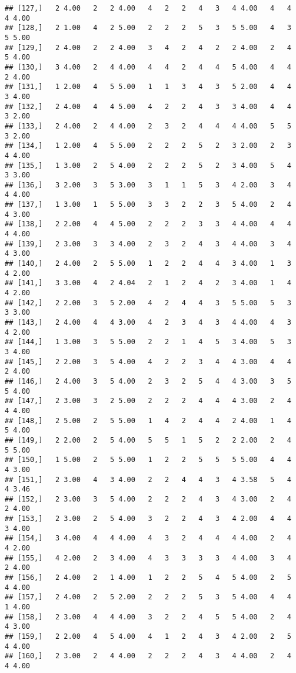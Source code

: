 \documentclass[]{article}
\begin{document}
\begin{verbatim}
## [127,]   2 4.00   2   2 4.00   4   2   2   4   3   4 4.00   4   4   4 4.00
## [128,]   2 1.00   4   2 5.00   2   2   2   5   3   5 5.00   4   3   5 5.00
## [129,]   2 4.00   2   2 4.00   3   4   2   4   2   2 4.00   2   4   5 4.00
## [130,]   3 4.00   2   4 4.00   4   4   2   4   4   5 4.00   4   4   2 4.00
## [131,]   1 2.00   4   5 5.00   1   1   3   4   3   5 2.00   4   4   3 4.00
## [132,]   2 4.00   4   4 5.00   4   2   2   4   3   3 4.00   4   4   3 2.00
## [133,]   2 4.00   2   4 4.00   2   3   2   4   4   4 4.00   5   5   3 2.00
## [134,]   1 2.00   4   5 5.00   2   2   2   5   2   3 2.00   2   3   4 4.00
## [135,]   1 3.00   2   5 4.00   2   2   2   5   2   3 4.00   5   4   3 3.00
## [136,]   3 2.00   3   5 3.00   3   1   1   5   3   4 2.00   3   4   4 4.00
## [137,]   1 3.00   1   5 5.00   3   3   2   2   3   5 4.00   2   4   4 3.00
## [138,]   2 2.00   4   4 5.00   2   2   2   3   3   4 4.00   4   4   4 4.00
## [139,]   2 3.00   3   3 4.00   2   3   2   4   3   4 4.00   3   4   4 3.00
## [140,]   2 4.00   2   5 5.00   1   2   2   4   4   3 4.00   1   3   4 2.00
## [141,]   3 3.00   4   2 4.04   2   1   2   4   2   3 4.00   1   4   4 2.00
## [142,]   2 2.00   3   5 2.00   4   2   4   4   3   5 5.00   5   3   3 3.00
## [143,]   2 4.00   4   4 3.00   4   2   3   4   3   4 4.00   4   3   4 2.00
## [144,]   1 3.00   3   5 5.00   2   2   1   4   5   3 4.00   5   3   3 4.00
## [145,]   2 2.00   3   5 4.00   4   2   2   3   4   4 3.00   4   4   2 4.00
## [146,]   2 4.00   3   5 4.00   2   3   2   5   4   4 3.00   3   5   5 4.00
## [147,]   2 3.00   3   2 5.00   2   2   2   4   4   4 3.00   2   4   4 4.00
## [148,]   2 5.00   2   5 5.00   1   4   2   4   4   2 4.00   1   4   5 4.00
## [149,]   2 2.00   2   5 4.00   5   5   1   5   2   2 2.00   2   4   5 5.00
## [150,]   1 5.00   2   5 5.00   1   2   2   5   5   5 5.00   4   4   4 3.00
## [151,]   2 3.00   4   3 4.00   2   2   4   4   3   4 3.58   5   4   4 3.46
## [152,]   2 3.00   3   5 4.00   2   2   2   4   3   4 3.00   2   4   2 4.00
## [153,]   2 3.00   2   5 4.00   3   2   2   4   3   4 2.00   4   4   3 4.00
## [154,]   3 4.00   4   4 4.00   4   3   2   4   4   4 4.00   2   4   4 2.00
## [155,]   4 2.00   2   3 4.00   4   3   3   3   3   4 4.00   3   4   2 4.00
## [156,]   2 4.00   2   1 4.00   1   2   2   5   4   5 4.00   2   5   4 4.00
## [157,]   2 4.00   2   5 2.00   2   2   2   5   3   5 4.00   4   4   1 4.00
## [158,]   2 3.00   4   4 4.00   3   2   2   4   5   5 4.00   2   4   4 3.00
## [159,]   2 2.00   4   5 4.00   4   1   2   4   3   4 2.00   2   5   4 4.00
## [160,]   2 3.00   2   4 4.00   2   2   2   4   3   4 4.00   2   4   4 4.00

\end{verbatim}
\end{document}
